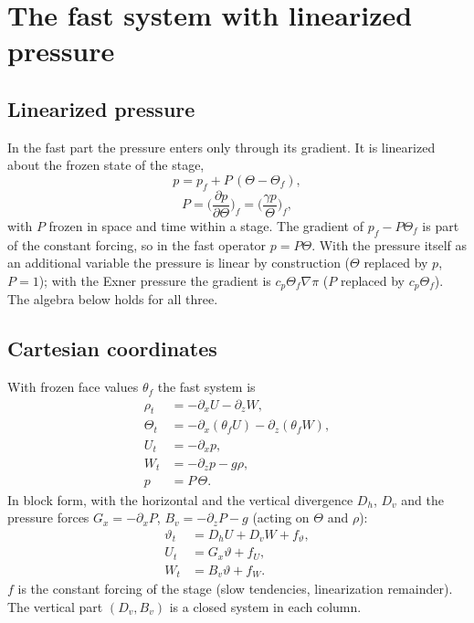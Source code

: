 \documentclass[11pt,a4paper]{article}
\newcommand{\tv}{\vartheta}   %
\begin{document}
\section{The fast system with linearized pressure}\label{sec:sys}
\subsection{Linearized pressure}
In the fast part the pressure enters only through its gradient. It is linearized about the frozen
state of the stage,
\[
p=p_f+P\,(\Theta-\Theta_f),
\]
\[
P=\Big(\frac{\partial p}{\partial\Theta}\Big)_f=\Big(\frac{\gamma p}{\Theta}\Big)_f ,
\]
with $P$ frozen in space and time within a stage. The gradient of $p_f-P\Theta_f$ is part of the constant
forcing, so in the fast operator $p=P\Theta$. With the pressure itself as an additional variable the
pressure is linear by construction ($\Theta$ replaced by $p$, $P=1$); with the Exner pressure the gradient is
$c_p\Theta_f\nabla\pi$ ($P$ replaced by $c_p\Theta_f$). The algebra below holds for all three.

\subsection{Cartesian coordinates}
With frozen face values $\theta_f$ the fast system is
\begin{align*}
\rho_t&=-\partial_xU-\partial_zW,\\
\Theta_t&=-\partial_x(\theta_fU)-\partial_z(\theta_fW),\\
U_t&=-\partial_xp,\\
W_t&=-\partial_zp-g\rho,\\
p&=P\,\Theta .
\end{align*}
In block form, with the horizontal and the vertical divergence $D_h$, $D_v$ and the pressure forces
$G_x=-\partial_x P$, $B_v=-\partial_zP-g$ (acting on $\Theta$ and $\rho$):
\begin{align*}
\tv_t&=D_hU+D_vW+f_\tv,\\
U_t&=G_x\tv+f_U,\\
W_t&=B_v\tv+f_W .
\end{align*}
$f$ is the constant forcing of the stage (slow tendencies, linearization remainder). The vertical part
$(D_v,B_v)$ is a closed system in each column.
\end{document}
